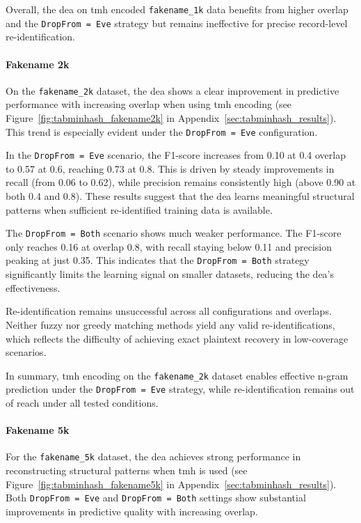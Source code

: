 Overall, the \ac{dea} on \ac{tmh} encoded \texttt{fakename\_1k} data benefits from higher overlap and the \texttt{DropFrom = Eve} strategy but remains ineffective for precise record-level re-identification.


\paragraph{Fakename 2k}

On the \texttt{fakename\_2k} dataset, the \ac{dea} shows a clear improvement in predictive performance with increasing overlap when using \ac{tmh} encoding (see Figure~\ref{fig:tabminhash_fakename2k} in Appendix~\ref{sec:tabminhash_results}).
This trend is especially evident under the \texttt{DropFrom = Eve} configuration.

In the \texttt{DropFrom = Eve} scenario, the F1-score increases from 0.10 at 0.4 overlap to 0.57 at 0.6, reaching 0.73 at 0.8.
This is driven by steady improvements in recall (from 0.06 to 0.62), while precision remains consistently high (above 0.90 at both 0.4 and 0.8).
These results suggest that the \ac{dea} learns meaningful structural patterns when sufficient re-identified training data is available.

The \texttt{DropFrom = Both} scenario shows much weaker performance.
The F1-score only reaches 0.16 at overlap 0.8, with recall staying below 0.11 and precision peaking at just 0.35.
This indicates that the \texttt{DropFrom = Both} strategy significantly limits the learning signal on smaller datasets, reducing the \ac{dea}'s effectiveness.

Re-identification remains unsuccessful across all configurations and overlaps.
Neither fuzzy nor greedy matching methods yield any valid re-identifications, which reflects the difficulty of achieving exact plaintext recovery in low-coverage scenarios.



In summary, \ac{tmh} encoding on the \texttt{fakename\_2k} dataset enables effective n-gram prediction under the \texttt{DropFrom = Eve} strategy, while re-identification remains out of reach under all tested conditions.


\paragraph{Fakename 5k}

For the \texttt{fakename\_5k} dataset, the \ac{dea} achieves strong performance in reconstructing structural patterns when \ac{tmh} is used (see Figure~\ref{fig:tabminhash_fakename5k} in Appendix~\ref{sec:tabminhash_results}).
Both \texttt{DropFrom = Eve} and \texttt{DropFrom = Both} settings show substantial improvements in predictive quality with increasing overlap.

